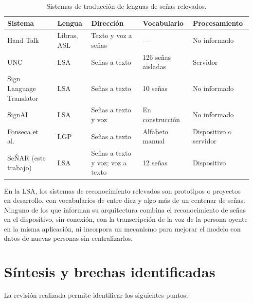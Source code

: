 \begin{table}[h]
    \centering
    \small
    \begin{tabular}{p{3.4cm}p{2.0cm}p{2.6cm}p{2.6cm}p{2.4cm}}
        \toprule
        Sistema & Lengua & Dirección & Vocabulario & Procesamiento \\
        \midrule
        Hand Talk~\cite{handtalk} & Libras, ASL & Texto y voz a señas & --- & No informado \\
        UNC~\cite{severini2025lsaweb} & LSA & Señas a texto & 126 señas aisladas & Servidor \\
        Sign Language Translator~\cite{infobae2026slt} & LSA & Señas a texto & 10 señas & No informado \\
        SignAI~\cite{signai} & LSA & Señas a texto y voz & En construcción & No informado \\
        Fonseca et al.~\cite{fonseca2025lgp} & LGP & Señas a texto & Alfabeto manual & Dispositivo o servidor \\
        SeÑAR (este trabajo) & LSA & Señas a texto y voz; voz a texto & 12 señas & Dispositivo \\
        \bottomrule
    \end{tabular}
    \caption{Sistemas de traducción de lenguas de señas relevados.}
    \label{tab:apps-existentes}
\end{table}

En la LSA, los sistemas de reconocimiento relevados son prototipos o proyectos en desarrollo, con vocabularios de entre diez y algo más de un centenar de señas. Ninguno de los que informan su arquitectura combina el reconocimiento de señas en el dispositivo, sin conexión, con la transcripción de la voz de la persona oyente en la misma aplicación, ni incorpora un mecanismo para mejorar el modelo con datos de nuevas personas sin centralizarlos.

\section{Síntesis y brechas identificadas}

La revisión realizada permite identificar los siguientes puntos:

